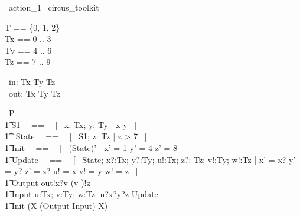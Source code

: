 \begin{zsection}
  \SECTION\ action\_1 \parents\ circus\_toolkit
\end{zsection}

\begin{zed}
    T == \{0, 1, 2\} \\
	Tx == 0 .. 3 \\ 
	Ty == 4 .. 6 \\ 
	Tz == 7 .. 9 \\ 
\end{zed}

\begin{circus}
	\circchannel\ in: Tx \cross Ty \cross Tz \\
	\circchannel\ out: Tx \cross Ty \cross Tz \\
\end{circus}

\begin{circus}
    \circprocess\ P \circdef \circbegin \\
        \t1 S1 ~~==~~ [~  x: Tx; y: Ty | x  \land y  ~] \\
        \t1 \circstate\ State ~~==~~ [~ S1; z: Tz | z > 7 ~] \\
        \t1 Init ~~==~~ [~ (State)' | x' = 1 \land y' = 4 \land z' = 8 ~] \\
        \t1 Update ~~==~~ [~ \Delta State; x?:Tx; y?:Ty; u!:Tx; z?: Tz; v!:Ty; w!:Tz | x' = x? \land y' = y? \land z' = z? \land u! = x \land v! = y \land w! = z ~] \\
        \t1 Output \circdef out!x?v \prefixcolon (v )!z \then \Skip \\
        \t1 Input \circdef \circvar u:Tx; v:Ty; w:Tz \circspot in?x?y?z \then \lschexpract Update \rschexpract \\
        \t1 \circspot \lschexpract Init \rschexpract \circseq (\circmu X \circspot (Output \extchoice Input) \circseq X) \\ 
	\circend
\end{circus}


